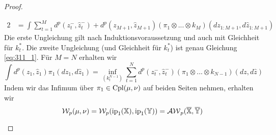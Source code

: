 \begin{proof}
\begin{enumerate}
\begin{alignat*}{2}
&= \int \sum_{t=1}^{M}d^p(z_t^-, \hat{z}_t^-) + d^p(z_{M+1}, \hat{z}_{M+1})(\pi_1 \otimes ...\otimes k_M)(dz_{1:M+1}, d\hat{z}_{1:M+1})
\end{alignat*}
Die erste Ungleichung gilt nach Induktionsvoraussetzung und auch mit Gleichheit für $k_t^*$. Die zweite Ungleichung (und Gleichheit für $k_t^*$) ist genau Gleichung \ref{eq:311_1}.
Für $M=N$ erhalten wir
$$\int d^p(z_1, \hat{z}_1)\pi_1(dz_1, d\hat{z}_1) = \inf_{(k_t^{N-1})} \sum_{t=1}^Nd^p(z_t^-, \hat{z}_t^-)(\pi_1 \otimes ... \otimes k_{N-1})(dz, d\hat{z})$$
Indem wir das Infimum über $\pi_1 \in \operatorname{Cpl}(\mu, \nu)$ auf beiden Seiten nehmen, erhalten wir
$$\mathcal{W}_p(\mu, \nu) = \mathcal{W}_p(\operatorname{ip}_1(\mathbb{X}), \operatorname{ip}_1(\mathbb{Y})) = \mathcal{AW}_p(\overline{\mathbb{X}}, \overline{\mathbb{Y}})$$
\end{enumerate}
\end{proof}

